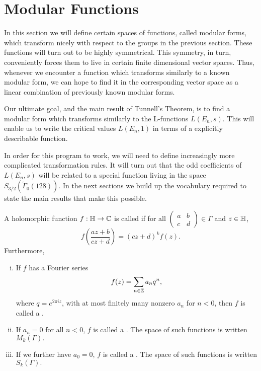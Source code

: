 \documentclass[12pt, a4paper]{report}
\begin{document}
\section{Modular Functions}

In this section we will define certain spaces of functions, called modular forms,
which transform
nicely with respect to the groups in the previous section. These functions will
turn out to be highly symmetrical. This symmetry, in turn, conveniently forces
them to live
in certain finite dimensional vector spaces. Thus, whenever we encounter a
function which transforms similarly to a known modular form, we can hope to find
it in the corresponding vector space as a linear combination of previously known
modular forms.

Our ultimate goal, and the main result of Tunnell's Theorem, is to
find a modular form which transforms similarly to the L-functions $L(E_n,s)$.
This will enable us to write the critical values $L(E_n,1)$ in terms of a
explicitly describable function.  

In order for this program to work, we will need to define increasingly more
complicated transformation rules. It will turn out that the odd coefficients of
$L(E_n,s)$ will be
related to a special function living in the space
$S_{3/2}(\tilde{\Gamma}_0(128)).$ In the next sections we build up the
vocabulary required to state the main results that make this possible.

\begin{defn}
  A holomorphic function $f : \mathbb{H} \rightarrow {\mathbb C}$ is called  if for all $\left(
    \begin{smallmatrix}
      a & b \\ c & d
    \end{smallmatrix}
  \right) \in \Gamma$ and $z \in \mathbb{H}$,
  \[f \left( \frac{az+b}{cz+d} \right) = (cz+d)^k f(z). \]
  Furthermore,
  \begin{enumerate}[(i)]
  \item If $f$ has a Fourier series $$f(z) = \sum\limits_{n \in {\mathbb Z}} a_n q^n,$$
    where $q = e^{2\pi i z}$, with at most finitely many nonzero $a_n$ for $n <
    0$, then $f$ is called a . 
  \item If $a_n = 0$ for all $n < 0$, $f$ is called a . The space of such functions is written $M_k(\Gamma).$
  \item If we further have $a_0 = 0$, $f$ is called a . The space of such functions is written $S_k(\Gamma).$
  \end{enumerate}
\end{defn}
\end{document}
